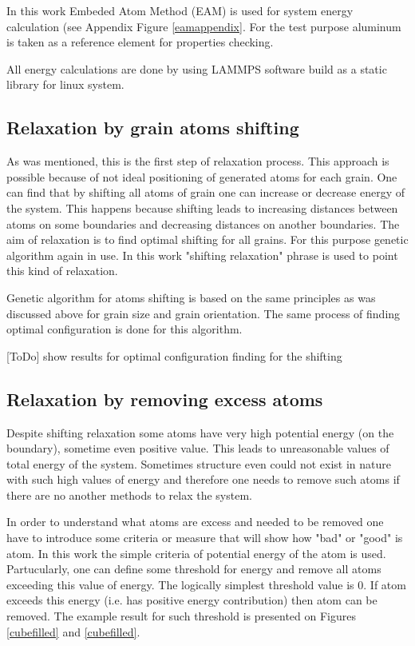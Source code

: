 \documentclass[12pt]{report}
\begin{document}
In this work Embeded Atom Method (EAM) is used for system energy calculation (see Appendix Figure \ref{eamappendix}. For the test purpose aluminum is taken as a reference element for properties checking. 

All energy calculations are done by using LAMMPS software build as a static library for linux system.

\subsection{Relaxation by grain atoms shifting}

As was mentioned, this is the first step of relaxation process. This approach is possible because of not ideal positioning of generated atoms for each grain. One can find that by shifting all atoms of grain one can increase or decrease energy of the system. This happens because shifting leads to increasing distances between atoms on some boundaries and decreasing distances on another boundaries. The aim of relaxation is to find optimal shifting for all grains. For this purpose genetic algorithm again in use. In this work "shifting relaxation" phrase is used to point this kind of relaxation.

Genetic algorithm for atoms shifting is based on the same principles as was discussed above for grain size and grain orientation. The same process of finding optimal configuration is done for this algorithm. 

[ToDo] show results for optimal configuration finding for the shifting

\subsection{Relaxation by removing excess atoms}

Despite shifting relaxation some atoms have very high potential energy (on the boundary), sometime even positive value. This leads to unreasonable values of total energy of the system. Sometimes structure even could not exist in nature with such high values of energy and therefore one needs to remove such atoms if there are no another methods to relax the system.

In order to understand what atoms are excess and needed to be removed one have to introduce some criteria or measure that will show how "bad" or "good" is atom. In this work the simple criteria of potential energy of the atom is used. Partucularly, one can define some threshold for energy and remove all atoms exceeding this value of energy. The logically simplest threshold value is 0. If atom exceeds this energy (i.e. has positive energy contribution) then atom can be removed. The example result for such threshold is presented on Figures \ref{cubefilled} and \ref{cubefilled}.
\end{document}
